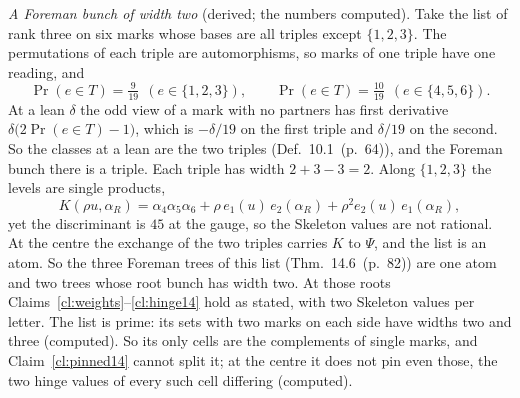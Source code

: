 \documentclass[11pt]{article}
\newcommand{\hb}[2]{#1~(p.~#2)}   %
\theoremstyle{plain}
\theoremstyle{remark}
\begin{document}
\emph{A Foreman bunch of width two} (derived; the numbers computed). Take the list of rank three on six marks whose bases are all triples except $\{1,2,3\}$. The permutations of each triple are automorphisms, so marks of one triple have one reading, and
\[
\Pr(e\in T)=\tfrac9{19}\ \ (e\in\{1,2,3\}),\qquad \Pr(e\in T)=\tfrac{10}{19}\ \ (e\in\{4,5,6\}).
\]
At a lean $\delta$ the odd view of a mark with no partners has first derivative $\delta\big(2\Pr(e\in T)-1\big)$, which is $-\delta/19$ on the first triple and $\delta/19$ on the second. So the classes at a lean are the two triples (Def.~\hb{10.1}{64}), and the Foreman bunch there is a triple. Each triple has width $2+3-3=2$. Along $\{1,2,3\}$ the levels are single products,
\[
K(\rho u,\alpha_R)=\alpha_4\alpha_5\alpha_6+\rho\,e_1(u)\,e_2(\alpha_R)+\rho^2e_2(u)\,e_1(\alpha_R),
\]
yet the discriminant is $45$ at the gauge, so the Skeleton values are not rational. At the centre the exchange of the two triples carries $K$ to $\Psi$, and the list is an atom. So the three Foreman trees of this list (Thm.~\hb{14.6}{82}) are one atom and two trees whose root bunch has width two. At those roots Claims~\ref{cl:weights}--\ref{cl:hinge14} hold as stated, with two Skeleton values per letter. The list is prime: its sets with two marks on each side have widths two and three (computed). So its only cells are the complements of single marks, and Claim~\ref{cl:pinned14} cannot split it; at the centre it does not pin even those, the two hinge values of every such cell differing (computed).
\end{document}
